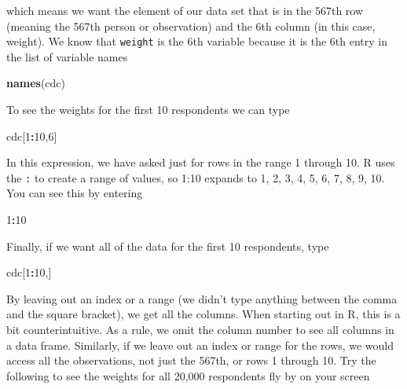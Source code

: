 \documentclass[]{book}
\newenvironment{Shaded}{\begin{snugshade}}{\end{snugshade}}
\newcommand{\KeywordTok}[1]{\textcolor[rgb]{0.13,0.29,0.53}{\textbf{#1}}}
\newcommand{\DecValTok}[1]{\textcolor[rgb]{0.00,0.00,0.81}{#1}}
\newcommand{\OperatorTok}[1]{\textcolor[rgb]{0.81,0.36,0.00}{\textbf{#1}}}
\newcommand{\NormalTok}[1]{#1}
\theoremstyle{definition}
\theoremstyle{definition}
\theoremstyle{definition}
\theoremstyle{remark}
\begin{document}
which means we want the element of our data set that is in the 567th row
(meaning the 567th person or observation) and the 6th column (in this
case, weight). We know that \texttt{weight} is the 6th variable because
it is the 6th entry in the list of variable names

\begin{Shaded}
\begin{Highlighting}[]
\KeywordTok{names}\NormalTok{(cdc)}
\end{Highlighting}
\end{Shaded}

To see the weights for the first 10 respondents we can type

\begin{Shaded}
\begin{Highlighting}[]
\NormalTok{cdc[}\DecValTok{1}\OperatorTok{:}\DecValTok{10}\NormalTok{,}\DecValTok{6}\NormalTok{]}
\end{Highlighting}
\end{Shaded}

In this expression, we have asked just for rows in the range 1 through
10. R uses the \texttt{:} to create a range of values, so 1:10 expands
to 1, 2, 3, 4, 5, 6, 7, 8, 9, 10. You can see this by entering

\begin{Shaded}
\begin{Highlighting}[]
\DecValTok{1}\OperatorTok{:}\DecValTok{10}
\end{Highlighting}
\end{Shaded}

Finally, if we want all of the data for the first 10 respondents, type

\begin{Shaded}
\begin{Highlighting}[]
\NormalTok{cdc[}\DecValTok{1}\OperatorTok{:}\DecValTok{10}\NormalTok{,]}
\end{Highlighting}
\end{Shaded}

By leaving out an index or a range (we didn't type anything between the
comma and the square bracket), we get all the columns. When starting out
in R, this is a bit counterintuitive. As a rule, we omit the column
number to see all columns in a data frame. Similarly, if we leave out an
index or range for the rows, we would access all the observations, not
just the 567th, or rows 1 through 10. Try the following to see the
weights for all 20,000 respondents fly by on your screen
\end{document}
